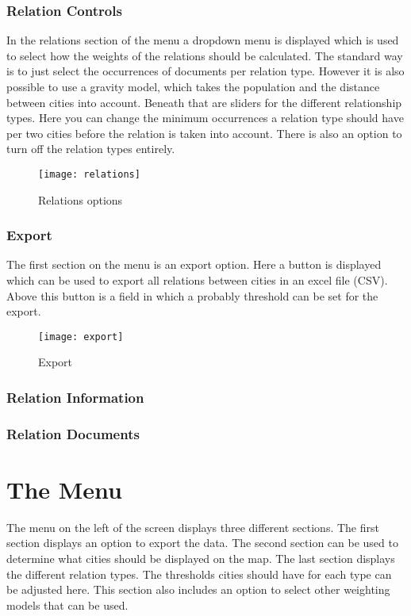 \subsubsection{Relation Controls}
In the relations section of the menu a dropdown menu is displayed which is used to select how the weights of the relations should be calculated. The standard way is to just select the occurrences of documents per relation type. However it is also possible to use a gravity model, which takes the population and the distance between cities into account.  Beneath that are sliders for the different relationship types. Here you can change the minimum occurrences a relation type should have per two cities before the relation is taken into account. There is also an option to turn off the relation types entirely.

\begin{figure}[H]
    \centering
    \texttt{[image: relations]}
    \caption{Relations options}
    \label{fig:infoflow}
\end{figure}

\subsubsection{Export}
The first section on the menu is an export option. Here a button is displayed which can be used to export all relations between cities in an excel file (CSV). Above this button is a field in which a probably threshold can be set for the export. 

\begin{figure}[H]
    \centering
    \texttt{[image: export]}
    \caption{Export}
    \label{fig:infoflow}
\end{figure}

\subsubsection{Relation Information}
\subsubsection{Relation Documents}


\section{The Menu}
The menu on the left of the screen displays three different sections. The first section displays an option to export the data. The second section can be used to determine what cities should be displayed on the map. The last section displays the different relation types. The thresholds cities should have for each type can be adjusted here. This section also includes an option to select other weighting models that can be used.


